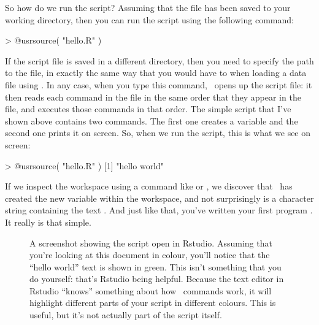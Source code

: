 So how do we run the script? Assuming that the  file has been saved to your working directory, then you can run the script using the following command:
\begin{rblock1}
> @usr{source( "hello.R" )}
\end{rblock1}
If the script file is saved in a different directory, then you need to specify the path to the file, in exactly the same way that you would have to when loading a data file using . In any case, when you type this command, \R\ opens up the script file: it then reads each command in the file in the same order that they appear in the file, and executes those commands in that order. The simple script that I've shown above contains two commands. The first one creates a variable  and the second one prints it on screen. So, when we run the script, this is what we see on screen:
\begin{rblock1}
> @usr{source( "hello.R" )}
[1] "hello world"
\end{rblock1}
If we inspect the workspace using a command like  or , we discover that \R\ has created the new variable  within the workspace, and not surprisingly  is a character string containing the text . And just like that, you've written your first program \R. It really is that simple. 



\begin{figure}[t]
\begin{center}
\caption{A screenshot showing the  script open in Rstudio. Assuming that you're looking at this document in colour, you'll notice that the ``hello world'' text is shown in green. This isn't something that you do yourself: that's Rstudio being helpful. Because the text editor in Rstudio ``knows'' something about how \R\ commands work, it will highlight different parts of your script in different colours. This is useful, but it's not actually part of the script itself.}
\label{fig:script2}
\HR
\end{center}
\end{figure}



